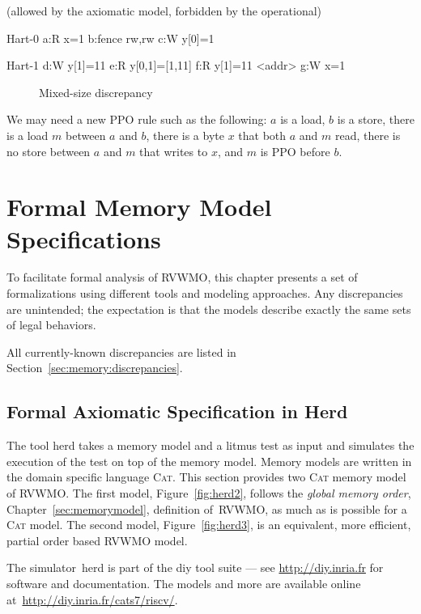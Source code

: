 \begin{verbbox}
(allowed by the axiomatic model, forbidden by the operational)

Hart-0
a:R x=1
b:fence rw,rw
c:W y[0]=1

Hart-1
d:W y[1]=11
e:R y[0,1]=[1,11]
f:R y[1]=11
  <addr>
g:W x=1
\end{verbbox}
\begin{figure}[h!]
  \centering\small
  \theverbbox
  \caption{Mixed-size discrepancy}
  \label{fig:litmus:discrepancy:rsw2}
\end{figure}

We may need a new PPO rule such as the following: $a$ is a load, $b$ is a store, there is a load $m$ between $a$ and $b$, there is a byte $x$ that both $a$ and $m$ read, there is no store between $a$ and $m$ that writes to $x$, and $m$ is PPO before $b$.

\chapter{Formal Memory Model Specifications}

To facilitate formal analysis of RVWMO, this chapter presents a set of formalizations using different tools and modeling approaches.  Any discrepancies are unintended; the expectation is that the models describe exactly the same sets of legal behaviors.

All currently-known discrepancies are listed in Section~\ref{sec:memory:discrepancies}.

\clearpage


\clearpage
\section{Formal Axiomatic Specification in Herd}
\label{sec:herd}

The tool \textsf{herd} takes a memory model and a litmus test as input and simulates the execution of the test on top of the memory model. Memory models are written in the domain specific language \textsc{Cat}. This section provides two \textsc{Cat} memory model of RVWMO. The first model, Figure~\ref{fig:herd2}, follows the \emph{global memory order}, Chapter~\ref{sec:memorymodel}, definition of~RVWMO, as much as is possible for a \textsc{Cat} model. The second model, Figure~\ref{fig:herd3}, is an equivalent, more efficient, partial order based RVWMO model.

The simulator~\textsf{herd} is part of the \textsf{diy} tool suite --- see \url{http://diy.inria.fr} for software and documentation. The models and more are available online at~\url{http://diy.inria.fr/cats7/riscv/}.


